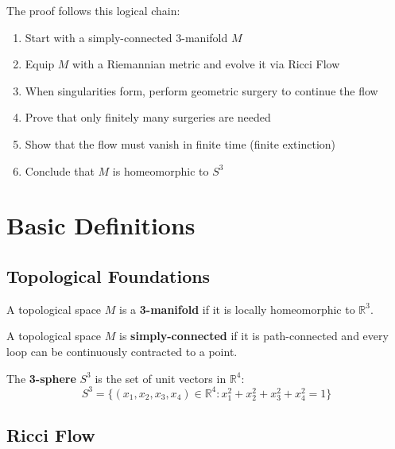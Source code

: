 The proof follows this logical chain:

\begin{enumerate}
\item Start with a simply-connected 3-manifold $M$
\item Equip $M$ with a Riemannian metric and evolve it via Ricci Flow
\item When singularities form, perform geometric surgery to continue the flow
\item Prove that only finitely many surgeries are needed
\item Show that the flow must vanish in finite time (finite extinction)
\item Conclude that $M$ is homeomorphic to $S^3$
\end{enumerate}

\chapter{Basic Definitions}
\label{chap:definitions}

\section{Topological Foundations}

\begin{definition}[3-Manifold]
\label{def:3manifold}
\leanok
A topological space $M$ is a \textbf{3-manifold} if it is locally homeomorphic to $\mathbb{R}^3$.
\end{definition}

\begin{definition}
\label{def:simply_connected}
\leanok
A topological space $M$ is \textbf{simply-connected} if it is path-connected and every loop can be continuously contracted to a point.
\end{definition}

\begin{definition}[3-Sphere]
\label{def:sphere3}
\leanok
The \textbf{3-sphere} $S^3$ is the set of unit vectors in $\mathbb{R}^4$:
\[
S^3 = \{(x_1, x_2, x_3, x_4) \in \mathbb{R}^4 : x_1^2 + x_2^2 + x_3^2 + x_4^2 = 1\}
\]
\end{definition}

\section{Ricci Flow}

